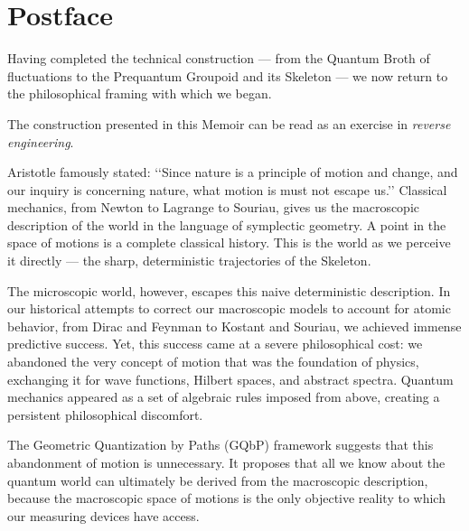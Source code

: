 \documentclass[10pt,reqno,letterpaper,twoside]{amsbook}
\begin{document}
  
  
  
  \chapter*{Postface}
  
  Having completed the technical construction — from the Quantum Broth
  of fluctuations to the Prequantum Groupoid and its Skeleton —
  we now return to the philosophical framing with which we began.
  
  The construction presented in this Memoir can be read as an exercise
  in \emph{reverse engineering}.
  
  Aristotle famously stated: \lq\lq Since nature is a principle of motion
  and change, and our inquiry is concerning nature, what motion is must
  not escape us.\rq\rq
  Classical mechanics, from Newton to Lagrange to Souriau, gives us the
  macroscopic description of the world in the language of symplectic
  geometry. A point in the space of motions is a complete classical
  history. This is the world as we perceive it directly — the sharp,
  deterministic trajectories of the Skeleton.
  
  The microscopic world,
  however,
  escapes this naive deterministic description.
  In our historical attempts to correct our macroscopic models to account for atomic behavior,
  from Dirac and Feynman to Kostant and Souriau,
  we achieved immense predictive success.
  Yet,
  this success came at a severe philosophical cost:
  we abandoned the very concept of motion that was the foundation of physics,
  exchanging it for wave functions,
  Hilbert spaces,
  and abstract spectra.
  Quantum mechanics appeared as a set of algebraic rules imposed from above,
  creating a persistent philosophical discomfort.
  
  The Geometric Quantization by Paths (GQbP) framework suggests
  that this abandonment of motion is unnecessary.
  It proposes that all we know about the quantum world can ultimately be derived from the macroscopic description,
  because the macroscopic space of motions is the only objective reality to which our measuring devices have access.
  
\end{document}
